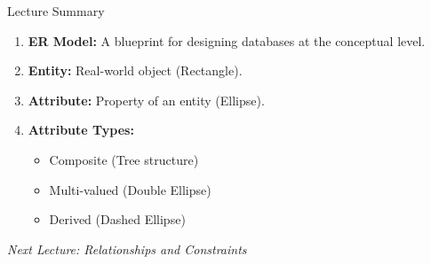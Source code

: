 \documentclass[aspectratio=169, xcolor=dvipsnames]{beamer}
\begin{document}
\begin{frame}{Lecture Summary}
    \begin{enumerate}
        \item \textbf{ER Model:} A blueprint for designing databases at the conceptual level.
        \item \textbf{Entity:} Real-world object (Rectangle).
        \item \textbf{Attribute:} Property of an entity (Ellipse).
        \item \textbf{Attribute Types:}
            \begin{itemize}
                \item Composite (Tree structure)
                \item Multi-valued (Double Ellipse)
                \item Derived (Dashed Ellipse)
            \end{itemize}
    \end{enumerate}
    
    \vspace{1em}
    \begin{center}
        \textit{Next Lecture: Relationships and Constraints}
    \end{center}
\end{frame}
\end{document}
